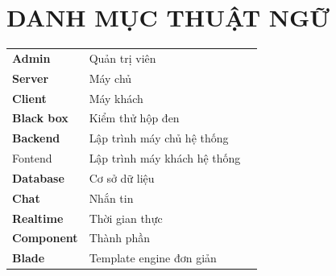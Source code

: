 \documentclass{article}
\begin{document}
\section*{DANH MỤC THUẬT NGỮ}
\begin{table}[H]
    \centering
    \begin{tabular}{p{} l p{}}
        \fontsize{13pt}{0pt}\selectfont \bfseries Admin&\fontsize{13pt}{0pt}\selectfont Quản trị viên\vspace{8pt}\\
        \fontsize{13pt}{0pt}\selectfont \bfseries Server&\fontsize{13pt}{0pt}\selectfont Máy chủ\vspace{8pt}\\
        \fontsize{13pt}{0pt}\selectfont \bfseries Client&\fontsize{13pt}{0pt}\selectfont Máy khách\vspace{8pt}\\
        \fontsize{13pt}{0pt}\selectfont \bfseries Black box&\fontsize{13pt}{0pt}\selectfont Kiểm thử hộp đen\vspace{8pt}\\
        \fontsize{13pt}{0pt}\selectfont \bfseries
        \fontsize{13pt}{0pt}\selectfont \bfseries Backend&\fontsize{13pt}{0pt}\selectfont Lập trình máy chủ hệ thống\vspace{8pt}\\
        Fontend&\fontsize{13pt}{0pt}\selectfont Lập trình máy khách hệ thống\vspace{8pt}\\
        \fontsize{13pt}{0pt}\selectfont \bfseries Database&\fontsize{13pt}{0pt}\selectfont Cơ sở dữ liệu\vspace{8pt}\\
        \fontsize{13pt}{0pt}\selectfont \bfseries Chat&\fontsize{13pt}{0pt}\selectfont Nhắn tin\vspace{8pt}\\
        \fontsize{13pt}{0pt}\selectfont \bfseries Realtime&\fontsize{13pt}{0pt}\selectfont Thời gian thực\vspace{8pt}\\
        \fontsize{13pt}{0pt}\selectfont \bfseries Component&\fontsize{13pt}{0pt}\selectfont Thành phần\vspace{8pt}\\
        \fontsize{13pt}{0pt}\selectfont \bfseries Blade&\fontsize{13pt}{0pt}\selectfont Template engine đơn giản\vspace{8pt}\\
    \end{tabular}
\end{table}
\cleardoublepage
\end{document}
